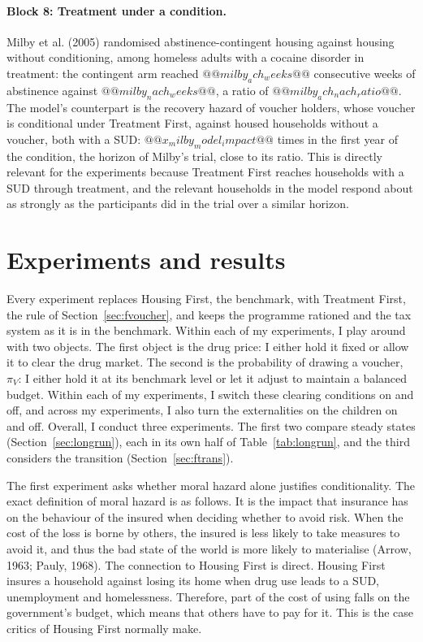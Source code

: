 \documentclass[10pt]{article}
\begin{document}
 \paragraph{Block 8:  Treatment under a condition.}
  Milby et al. (2005)  randomised abstinence-contingent housing against housing without conditioning, among homeless adults with a cocaine disorder in treatment: the contingent arm reached $@@milby_ach_weeks@@$ consecutive weeks of abstinence against $@@milby_nach_weeks@@$, a ratio of $@@milby_ach_nach_ratio@@$. The model's counterpart is the recovery hazard of voucher holders, whose voucher is conditional under Treatment First, against housed households without a voucher, both with a SUD: $@@x_milby_model_impact@@$ times in the first year of the condition, the horizon of Milby's trial, close to its ratio.   This is directly relevant for the experiments because Treatment First reaches households with a SUD through treatment, and the relevant households in the model respond about as strongly as the participants did in the trial over a similar horizon.






\section{Experiments and results}\label{sec:experiments}

Every experiment replaces Housing First, the benchmark, with Treatment First, the rule of Section~\ref{sec:fvoucher}, and keeps the programme rationed and the tax system as it is in the benchmark.     Within each of my experiments, I play around with two objects. The first object is the drug price: I either hold it fixed or allow it to clear the drug market. The second is the probability of drawing a voucher, $\pi_V$: I either hold it at its benchmark level or let it adjust to maintain a balanced budget. Within each of my experiments, I switch these clearing conditions on and off, and across my experiments, I also turn the externalities on the children on and off.  Overall, I conduct three experiments. The first two compare steady states (Section~\ref{sec:longrun}), each in its own half of Table~\ref{tab:longrun}, and the third considers the transition (Section~\ref{sec:ftrans}).

The first experiment asks whether moral hazard alone justifies conditionality.   The exact definition of moral hazard is as follows. It is the impact that insurance has on the behaviour of the insured when deciding whether to avoid risk. When the cost of the loss is borne by others, the insured is less likely to take measures to avoid it, and thus the bad state of the world is more likely to materialise (Arrow, 1963; Pauly, 1968). The connection to Housing First is direct. Housing First insures a household against losing its home when drug use leads to a SUD, unemployment and homelessness. Therefore, part of the cost of using falls on the government's budget, which means that others have to pay for it. This is the case critics of Housing First normally make.
\end{document}
